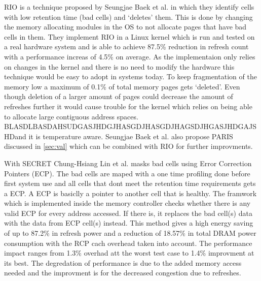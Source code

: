 RIO is a technique proposed by Seungjae Baek et al. \cite{rioparis} in which they identify cells with low retention time (bad cells) and `deletes' them. This is done by changing the memory allocating modules in the OS to not allocate pages that have bad cells in them. They implement RIO in a Linux kernel which is run and tested on a real hardware system and is able to achieve 87.5\% reduction in refresh count with a performance increas of 4.5\% on average. As the implementaion only relies on changes in the kernel and there is no need to modify the hardware this technique would be easy to adopt in systems today. To keep fragmentation of the memory low a maximum of 0.1\% of total memory pages gets `deleted'. Even though deletion of a larger amount of pages could decrease the amount of refreshes further it would cause trouble for the kernel which relies on being able to allocate large contiguous address spaces. BLASDLBASDAHSUDGASJHDGJHASGDJHASGDJHAGSDJHGASJHDGAJSHDand it is temperature aware. Seungjae Baek et al. also propose PARIS discussed in \ref{sec:val} which can be combined with RIO for further improvments.

With SECRET Chung-Hsiang Lin et al. \cite{secret} masks bad cells using Error Correction Pointers (ECP). The bad cells are maped with a one time profiling done before first system use and all cells that dont meet the retention time requirements gets a ECP. A ECP is basiclly a pointer to another cell that is healthy. The framwork which is implemented inside the memory controller checks whether there is any valid ECP for every address accessed. If there is, it replaces the bad cell(s) data with the data from ECP cell(s) instead.
This method gives a high energy saving of up to 87.2\% in refresh power and a reduction of 18.57\% in total DRAM power consumption with the RCP cach overhead taken into account.
The performance impact ranges from 1.3\% overhad att the worst test case to 1.4\% improvment at its best. The degredation of performance is due to the added memory access needed and the improvment is for the decreased congestion due to refreshes.
